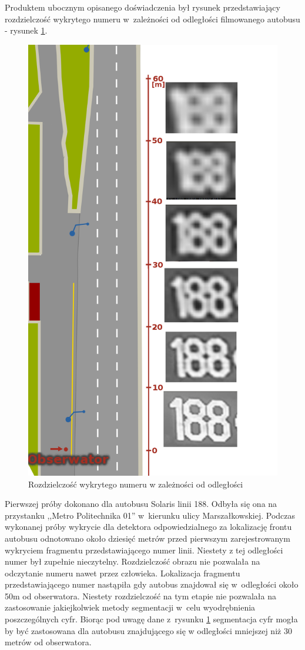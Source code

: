 Produktem ubocznym opisanego doświadczenia był rysunek
przedstawiający rozdzielczość wykrytego numeru w~zależności
od odległości filmowanego autobusu - rysunek \ref{fig:dist2res}.

\begin{figure}[!h]
    \centering
    \includegraphics[height=0.9\textwidth]{img/exp_numer_od_odleglosci}
    \caption{Rozdzielczość wykrytego numeru w zależności od odległości}
    \label{fig:dist2res}
\end{figure}

Pierwszej próby dokonano dla autobusu Solaris linii 188. Odbyła się
ona na przystanku ,,Metro Politechnika 01'' w~kierunku ulicy
Marszałkowskiej.
Podczas wykonanej próby wykrycie dla detektora
odpowiedzialnego za lokalizację frontu autobusu odnotowano około dziesięć
metrów przed pierwszym zarejestrowanym wykryciem fragmentu
przedstawiającego numer linii. Niestety z tej odległości numer był
zupełnie nieczytelny. Rozdzielczość obrazu nie pozwalała na odczytanie
numeru nawet przez człowieka.
Lokalizacja fragmentu przedstawiającego numer nastąpiła gdy autobus
znajdował się w~odległości około 50m od obserwatora. Niestety
rozdzielczość na tym etapie nie pozwalała na zastosowanie jakiejkolwiek
metody segmentacji w~celu wyodrębnienia poszczególnych cyfr. Biorąc pod
uwagę dane z~rysunku \ref{fig:dist2res} segmentacja cyfr mogła by być
zastosowana dla autobusu znajdującego się w odległości mniejszej niż
30 metrów od obserwatora. 


